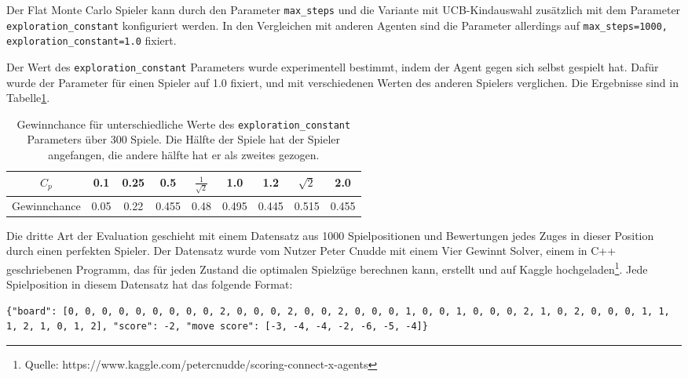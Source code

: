 Der Flat Monte Carlo Spieler kann durch den Parameter \verb|max_steps| und die Variante mit UCB-Kindauswahl zusätzlich mit dem Parameter \verb|exploration_constant| konfiguriert werden.
In den Vergleichen mit anderen Agenten sind die Parameter allerdings auf \verb|max_steps=1000, exploration_constant=1.0| fixiert.

Der Wert des \verb|exploration_constant| Parameters wurde experimentell bestimmt, indem der Agent gegen sich selbst gespielt hat.
Dafür wurde der Parameter für einen Spieler auf 1.0 fixiert, und mit verschiedenen Werten des anderen Spielers verglichen.
Die Ergebnisse sind in Tabelle\~\ref{tab:flat-mc}.

\begin{table}[h!]
\centering
\begin{tabular}{ |c||c|c|c|c|c|c|c|c| }
 \hline
 $C_p$ & 0.1 & 0.25 & 0.5 & $\frac{1}{\sqrt{2}}$ & 1.0 & 1.2 & $\sqrt{2}$ & 2.0 \\
 \hline
 Gewinnchance & 0.05 & 0.22 & 0.455 & 0.48 & 0.495 & 0.445 & 0.515 & 0.455 \\
 \hline
\end{tabular}
\caption{Gewinnchance für unterschiedliche Werte des \verb|exploration_constant| Parameters über 300 Spiele. Die Hälfte der Spiele hat der Spieler angefangen, die andere hälfte hat er als zweites gezogen.}
\label{tab:flat-mc}
\end{table}

Die dritte Art der Evaluation geschieht mit einem Datensatz aus 1000 Spielpositionen und Bewertungen jedes Zuges in dieser Position durch einen perfekten Spieler.
Der Datensatz wurde vom Nutzer Peter Cnudde mit einem Vier Gewinnt Solver, einem in C++ geschriebenen Programm, das für jeden Zustand die optimalen Spielzüge berechnen kann, erstellt und auf Kaggle hochgeladen\footnote{Quelle: https://www.kaggle.com/petercnudde/scoring-connect-x-agents}.
Jede Spielposition in diesem Datensatz hat das folgende Format:

\begin{verbatim}
{"board": [0, 0, 0, 0, 0, 0, 0, 0, 0, 2, 0, 0, 0, 2, 0, 0, 2, 0, 0, 0, 1, 0, 0, 1, 0, 0, 0, 2, 1, 0, 2, 0, 0, 0, 1, 1, 1, 2, 1, 0, 1, 2], "score": -2, "move score": [-3, -4, -4, -2, -6, -5, -4]}
\end{verbatim}

